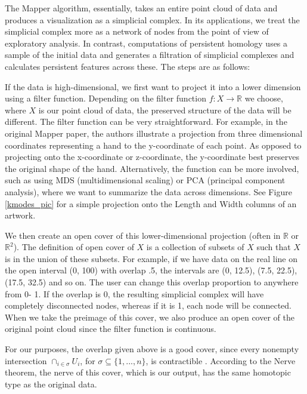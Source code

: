 \documentclass[12pt]{article}
\theoremstyle{definition}
\begin{document}
\par The Mapper algorithm, essentially, takes an entire point cloud of data and produces a visualization as a simplicial complex. In its applications, we treat the simplicial complex more as a network of nodes from the point of view of exploratory analysis. In contrast, computations of persistent homology uses a sample of the initial data and generates a filtration of simplicial complexes and calculates persistent features across these. The steps are as follows: 
\newline
\par If the data is high-dimensional, we first want to project it into a lower dimension using a filter function. Depending on the filter function $f: X \rightarrow \mathbb{R}$ we choose, where $X$ is our point cloud of data, the preserved structure of the data will be different. The filter function can be very straightforward. For example, in the original Mapper paper, the authors illustrate a projection from three dimensional coordinates representing a hand to the y-coordinate of each point. As opposed to projecting onto the x-coordinate or z-coordinate, the y-coordinate best preserves the original shape of the hand. Alternatively, the function can be more involved, such as using MDS (multidimensional scaling) or PCA (principal component analysis), where we want to summarize the data across dimensions. See Figure \ref{kmodes_pic} for a simple projection onto the Length and Width columns of an artwork. 
\newline
\par We then create an open cover of this lower-dimensional projection (often in $\mathbb{R}$ or $\mathbb{R}^2$). The definition of open cover of $X$ is a collection of subsets of $X$ such that $X$ is in the union of these subsets. For example, if we have data on the real line on the open interval (0, 100) with overlap .5, the intervals are (0, 12.5), (7.5, 22.5), (17.5, 32.5) and so on. The user can change this overlap proportion to anywhere from 0- 1. If the overlap is 0, the resulting simplicial complex will have completely disconnected nodes, whereas if it is 1, each node will be connected. When we take the preimage of this cover, we also produce an open cover of the original point cloud since the filter function is continuous. \cite{2018arXiv180300384C}
\newline
\par For our purposes, the overlap given above is a good cover, since every nonempty intersection
$\cap_{i \in\sigma} U_i$, for $\sigma \subseteq \{1,...,n\}$, is contractible \cite{2016arXiv160501905C}. According to the Nerve theorem, the nerve of this cover, which is our output, has the same homotopic type as the original data. 
\end{document}
